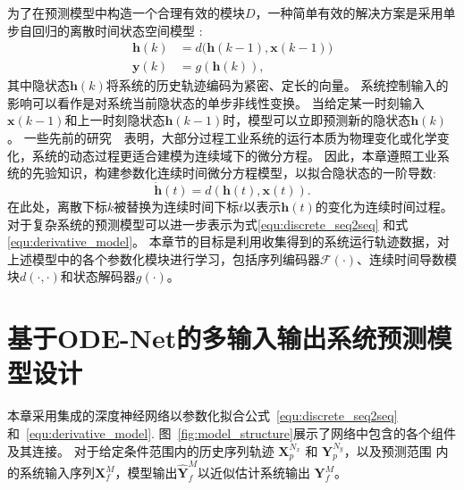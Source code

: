 为了在预测模型中构造一个合理有效的模块$D$，一种简单有效的解决方案是采用单步自回归的离散时间状态空间模型 \cite{4019326}:
\begin{equation}
    \begin{aligned}
\boldsymbol{h}(k)&=d\big(\boldsymbol{h}(k-1), \boldsymbol{x}(k-1)\big)\\
\boldsymbol{y}(k)&=g(\boldsymbol{h}(k)),
    \end{aligned}
\end{equation}
其中隐状态$\boldsymbol{h}(k)$将系统的历史轨迹编码为紧密、定长的向量。
系统控制输入的影响可以看作是对系统当前隐状态的单步非线性变换。
当给定某一时刻输入$\boldsymbol{x}(k-1)$和上一时刻隐状态$\boldsymbol{h}(k-1)$时，模型可以立即预测新的隐状态$\boldsymbol{h}(k)$。
一些先前的研究~\cite{CHAI201661}~\cite{KIM2004403}表明，大部分过程工业系统的运行本质为物理变化或化学变化，系统的动态过程更适合建模为连续域下的微分方程。
因此，本章遵照工业系统的先验知识，构建参数化连续时间微分方程模型，以拟合隐状态的一阶导数:
\begin{equation}
    \label{equ:derivative_model}
    \dot{\boldsymbol h}(t) = d(\boldsymbol{h}(t), \boldsymbol x(t)).
\end{equation}
在此处，离散下标$k$被替换为连续时间下标$t$以表示$\boldsymbol{h}(t)$的变化为连续时间过程。
对于复杂系统的预测模型可以进一步表示为式\eqref{equ:discrete_seq2seq} 和式 \eqref{equ:derivative_model}。
本章节的目标是利用收集得到的系统运行轨迹数据，对 上述模型中的各个参数化模块进行学习，包括序列编码器$\mathcal{F}(\cdot)$、连续时间导数模块$d(\cdot,\cdot)$和状态解码器$g(\cdot)$。
\section{基于ODE-Net的多输入输出系统预测模型设计}
\label{sec:model}
本章采用集成的深度神经网络以参数化拟合公式~\eqref{equ:discrete_seq2seq}和~\eqref{equ:derivative_model}.
图~\ref{fig:model_structure}展示了网络中包含的各个组件及其连接。
对于给定条件范围内的历史序列轨迹 $\boldsymbol{X}_{p}^{N_{x}}$ 和 $\boldsymbol{Y}_{p}^{N_{y}}$，以及预测范围 内的系统输入序列$\boldsymbol{X}_{f}^{M}$，模型输出$\hat{\boldsymbol{Y}}_{f}^{M}$以近似估计系统输出 $\boldsymbol{Y}_{f}^{M}$。

